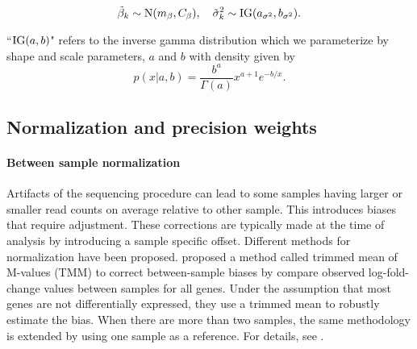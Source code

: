 \begin{equation}
\tilde{\beta}_k \sim \operatorname{N}(m_\beta, C_\beta),\quad \tilde{\sigma}^2_k \sim \operatorname{IG}(a_{\sigma^2}, b_{\sigma^2}).
\end{equation}

``$\operatorname{IG}(a,b)$" refers to the inverse gamma distribution which we parameterize by shape and scale parameters, $a$ and $b$ with density given by
\begin{equation*}
p(x|a,b) = \frac{b^a}{\Gamma(a)}x^{a+1}e^{-b/x}.
\end{equation*}


%
%
%

\subsection{Normalization and precision weights}
\label{norm-weight}
\paragraph{Between sample normalization}
Artifacts of the sequencing procedure can lead to some samples having larger or smaller read counts on average relative to other sample. This introduces biases that require adjustment. These corrections are typically made at the time of analysis by introducing a sample specific offset. Different methods for normalization have been proposed. \citet{robinson2010} proposed a method called trimmed mean of M-values (TMM) to correct between-sample biases by compare observed log-fold-change values between samples for all genes. Under the assumption that most genes are not differentially expressed, they use a trimmed mean to robustly estimate the bias. When there are more than two samples, the same methodology is extended by using one sample as a reference. For details, see \citet{robinson2010}.

